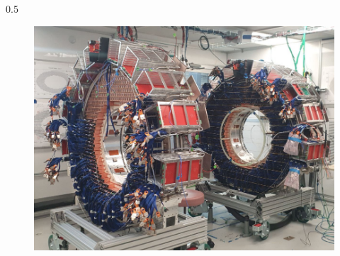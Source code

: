 \documentclass{beamer}
\begin{document}
\begin{frame}
\begin{columns}
\begin{column}{0.5\framewidth}
\begin{figure}[h]
            \includegraphics[width=\columnwidth ]{figures/png/Screenshot_20240706_151533.png}
        \end{figure}
        \end{column}
    \end{columns}
\end{frame}
\end{document}
